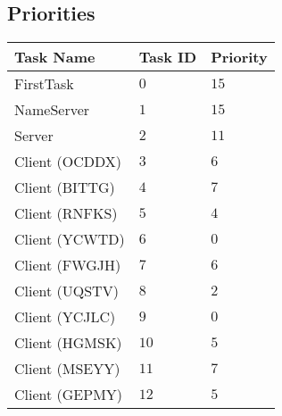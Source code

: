 \documentclass[12pt]{article}
\begin{document}
\subsection{Priorities}
\begin{tabular}{|l|l|l}
  \hline
  Task Name & Task ID & Priority \\\hline
  FirstTask       & $0$  & $15$ \\\hline
  NameServer      & $1$  & $15$ \\\hline
  Server          & $2$  & $11$ \\\hline
  Client (OCDDX)  & $3$  & $6$ \\\hline
  Client (BITTG)  & $4$  & $7$ \\\hline
  Client (RNFKS)  & $5$  & $4$ \\\hline
  Client (YCWTD)  & $6$  & $0$ \\\hline
  Client (FWGJH)  & $7$  & $6$ \\\hline
  Client (UQSTV)  & $8$  & $2$ \\\hline
  Client (YCJLC)  & $9$  & $0$ \\\hline
  Client (HGMSK)  & $10$ & $5$ \\\hline
  Client (MSEYY)  & $11$ & $7$ \\\hline
  Client (GEPMY)  & $12$ & $5$ \\\hline
\end{tabular}
\\[1\baselineskip]
\end{document}
